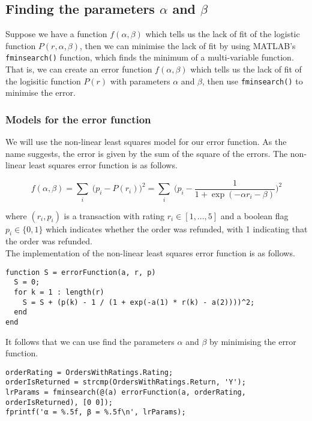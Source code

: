 \subsection{Finding the parameters $\alpha$ and $\beta$}
Suppose we have a function $f(\alpha, \beta)$ which tells us the lack of fit of the logistic function $P(r, \alpha, \beta)$, then we can minimise the lack of fit by using MATLAB's \lstinline|fminsearch()| function, which finds the minimum of a multi-variable function. That is, we can create an error function $f(\alpha, \beta)$ which tells us the lack of fit of the logisitic function $P(r)$ with parameters $\alpha$ and $\beta$, then use \lstinline|fminsearch()| to minimise the error.

\subsubsection{Models for the error function}
We will use the non-linear least squares model for our error function. As the name suggests, the error is given by the sum of the square of the errors. The non-linear least squares error function is as follows.

$$f(\alpha, \beta) = \sum_i \; \Big(p_i - P(r_i)\Big)^2 = \sum_i \; \Bigg(p_i - \frac{1}{1 + \exp(-\alpha r_i - \beta)}\Bigg)^2$$

\noindent
where $(r_i, p_i)$ is a transaction with rating $r_i \in [1, ..., 5]$ and a boolean flag $p_i \in \{0, 1\}$ which indicates whether the order was refunded, with 1 indicating that the order was refunded. \\

\noindent
The implementation of the non-linear least squares error function is as follows.

\begin{lstlisting}
function S = errorFunction(a, r, p)
  S = 0;
  for k = 1 : length(r)
    S = S + (p(k) - 1 / (1 + exp(-a(1) * r(k) - a(2))))^2;
  end
end
\end{lstlisting}

\noindent
It follows that we can use find the parameters $\alpha$ and $\beta$ by minimising the error function.

\begin{lstlisting}
orderRating = OrdersWithRatings.Rating;
orderIsReturned = strcmp(OrdersWithRatings.Return, 'Y');
lrParams = fminsearch(@(a) errorFunction(a, orderRating, orderIsReturned), [0 0]);
fprintf('α = %.5f, β = %.5f\n', lrParams); 
\end{lstlisting}

